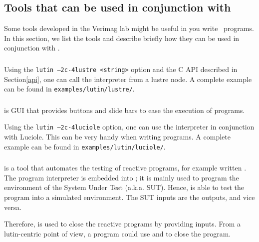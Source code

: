 \subsection{Tools that can be used in conjunction with \lutin}



Some tools developed in the Verimag  lab might be useful in you write
\lutin\  programs. In  this section,  we  list the  tools and  describe
briefly how they can be used in conjunction with \lutin.



\subsubsection{\lustre}

Using the {\tt lutin --2c-4lustre <string>} option and the C API
described in Section\ref{api}, one can call the
\lutin interpreter from  a lustre node.
A complete example can be found in \verb+examples/lutin/lustre/+.

\subsubsection{\luciole}


\luciole is GUI that provides buttons and slide bars to
ease the execution of \lustre programs.


Using the  {\tt lutin --2c-4luciole}  option, one can use  the \lutin
interpreter in conjunction with Luciole.  This can be very handy when
writing \lutin programs.
A complete example can be found in \verb+examples/lutin/luciole/+.



\subsubsection{\lurette}

\lurette is  a tool that  automates the testing of  reactive programs,
for example written \lustre. The \lutin program interpreter is embedded
into \lurette;  it is  mainly used to  program the environment  of the
System Under Test  (a.k.a. SUT).  Hence, \lurette is  able to test the
program into a  simulated environment.  The SUT inputs  are the \lutin
outputs, and vice versa.

Therefore, \lutin is used to  close the reactive programs by providing
inputs. From a lutin-centric point  of view, a \lutin program could use
\lurette and \lustre to close the \lutin program.

